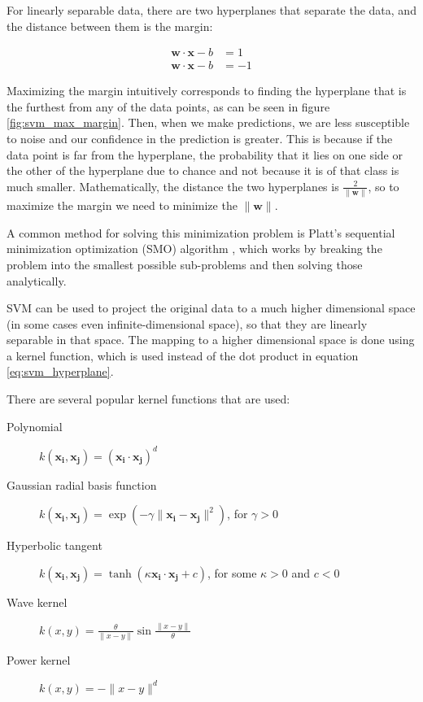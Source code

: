 For linearly separable data, there are two hyperplanes that separate the data, and the distance between them is the margin: 

\begin{align*} 
 \mathbf{w}\cdot\mathbf{x} - b &=1 \\
 \mathbf{w}\cdot\mathbf{x} - b &=-1
\end{align*}

Maximizing the margin intuitively corresponds to finding the hyperplane that is the furthest from any of the data points, as can be seen in figure \ref{fig:svm_max_margin}. Then, when we make predictions, we are less susceptible to noise and our confidence in the prediction is greater. This is because if the data point is far from the hyperplane, the probability that it lies on one side or the other of the hyperplane due to chance and not because it is of that class is much smaller. Mathematically, the distance the two hyperplanes is $ \tfrac{2}{\|\mathbf{w}\|} $, so to maximize the margin we need to minimize the $ \| \mathbf{w} \| $. 

A common method for solving this minimization problem is Platt's sequential minimization optimization (SMO) algorithm \cite{platt1998sequential}, which works by breaking the problem into the smallest possible sub-problems and then solving those analytically. 

SVM can be used to project the original data to a much higher dimensional space (in some cases even infinite-dimensional space), so that they are linearly separable in that space. The mapping to a higher dimensional space is done using a kernel function, which is used instead of the dot product in equation \eqref{eq:svm_hyperplane}.

There are several popular kernel functions that are used: 
\begin{description}
\item[Polynomial] $ k(\mathbf{x_i},\mathbf{x_j})=(\mathbf{x_i} \cdot \mathbf{x_j})^d$ \cite{goldberg2008splitsvm}
\item[Gaussian radial basis function] $ k(\mathbf{x_i},\mathbf{x_j})=\exp(-\gamma \|\mathbf{x_i} - \mathbf{x_j}\|^2)$, for $ \gamma > 0 $ \cite{Chang:2010:TTL:1756006.1859899}
\item[Hyperbolic tangent] $ k(\mathbf{x_i},\mathbf{x_j})=\tanh(\kappa \mathbf{x_i} \cdot \mathbf{x_j}+c) $, for some $ \kappa > 0 $ and $ c < 0 $ \cite{sellathurai1999separability}
\item[Wave kernel] $ k(x, y) = \frac{\theta}{\| x-y \| } \sin \frac{\| x-y \| }{\theta} $ 
\item[Power kernel] $ k(x,y) = - \lVert x-y \rVert ^d $ \cite{fleuret2003scale}
\end{description}

